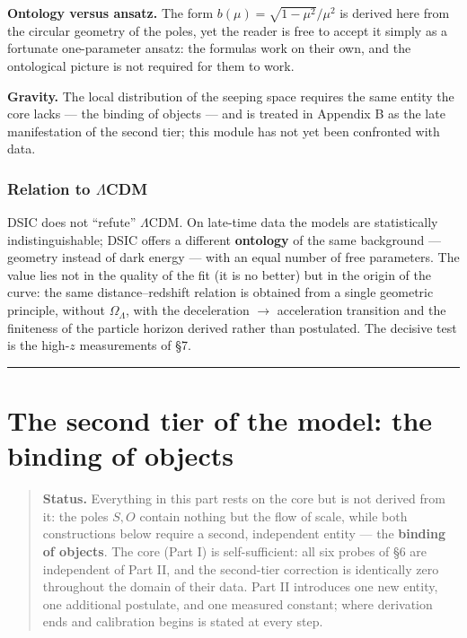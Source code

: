 \documentclass{article}
\begin{document}
\medskip
\noindent\textbf{Ontology versus ansatz.} The form $b(\mu) = \sqrt{1-\mu^2}/\mu^2$ is derived here from the circular geometry of the poles, yet the reader is free to accept it simply as a fortunate one-parameter ansatz: the formulas work on their own, and the ontological picture is not required for them to work.

\medskip
\noindent\textbf{Gravity.} The local distribution of the seeping space requires the same entity the core lacks --- the binding of objects --- and is treated in Appendix B as the late manifestation of the second tier; this module has not yet been confronted with data.
\section{Relation to $\Lambda$CDM}

DSIC does not ``refute'' $\Lambda$CDM. On late-time data the models are statistically indistinguishable; DSIC offers a different \textbf{ontology} of the same background --- geometry instead of dark energy --- with an equal number of free parameters. The value lies not in the quality of the fit (it is no better) but in the origin of the curve: the same distance--redshift relation is obtained from a single geometric principle, without $\Omega_\Lambda$, with the deceleration $\to$ acceleration transition and the finiteness of the particle horizon derived rather than postulated. The decisive test is the high-$z$ measurements of \S7.

\bigskip
\hrule
\bigskip

\part{The second tier of the model: the binding of objects}

\begin{quote}
\textbf{Status.} Everything in this part rests on the core but is not derived from it: the poles $S, O$ contain nothing but the flow of scale, while both constructions below require a second, independent entity --- the \textbf{binding of objects}. The core (Part I) is self-sufficient: all six probes of \S6 are independent of Part II, and the second-tier correction is identically zero throughout the domain of their data. Part II introduces one new entity, one additional postulate, and one measured constant; where derivation ends and calibration begins is stated at every step.
\end{quote}
\end{document}

